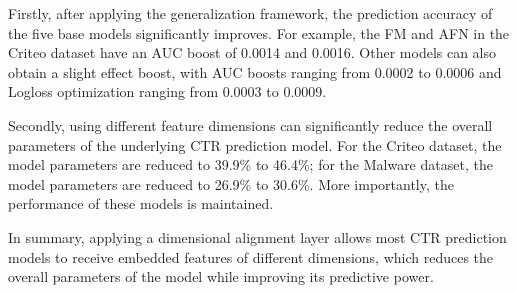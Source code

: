 \documentclass[sigconf]{acmart}
\begin{document}
Firstly, after applying the generalization framework, the prediction accuracy of the five base models significantly improves. For example, the FM and AFN in the Criteo dataset have an AUC boost of 0.0014 and 0.0016. Other models can also obtain a slight effect boost, with AUC boosts ranging from 0.0002 to 0.0006 and Logloss optimization ranging from 0.0003 to 0.0009.

Secondly, using different feature dimensions can significantly reduce the overall parameters of the underlying CTR prediction model. For the Criteo dataset, the model parameters are reduced to 39.9\% to 46.4\%; for the Malware dataset, the model parameters are reduced to 26.9\% to 30.6\%. More importantly, the performance of these models is maintained. 

In summary, applying a dimensional alignment layer allows most CTR prediction models to receive embedded features of different dimensions, which reduces the overall parameters of the model while improving its predictive power.


\clearpage{}
\end{document}
